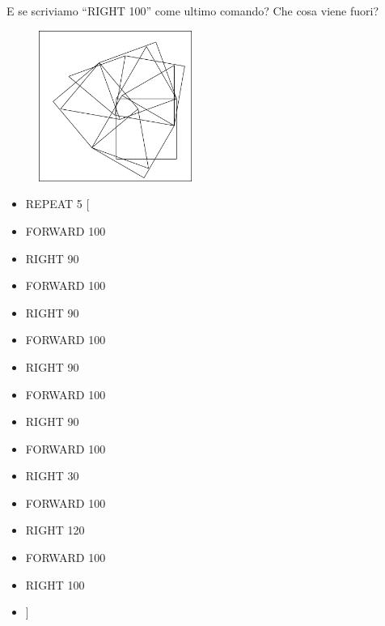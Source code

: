 E se scriviamo “RIGHT 100” come ultimo comando? Che cosa viene fuori? 

\begin{minipage}{0.5\textwidth}
\begin{figure}[H]
   \includegraphics[width=5.0cm,trim=4 4 6 4,clip]{./images/marta/mar-5.png}
   \label{mar-5}
\end{figure}
\end{minipage} \hfill
\begin{minipage}{0.45\textwidth}
\begin{itemize}[itemsep=-3pt,parsep=2pt]
\item[] \hspace{0.5cm} REPEAT 5 [
\item[] \hspace{0.5cm} 	FORWARD 100
\item[] \hspace{0.5cm} 	RIGHT 90
\item[] \hspace{0.5cm} 	FORWARD 100
\item[] \hspace{0.5cm} 	RIGHT 90
\item[] \hspace{0.5cm} 	FORWARD 100
\item[] \hspace{0.5cm} 	RIGHT 90
\item[] \hspace{0.5cm} 	FORWARD 100
\item[] \hspace{0.5cm} 	RIGHT 90
\item[] \hspace{0.5cm} 	FORWARD 100
\item[] \hspace{0.5cm} 	RIGHT 30
\item[] \hspace{0.5cm} 	FORWARD 100
\item[] \hspace{0.5cm} 	RIGHT 120
\item[] \hspace{0.5cm} 	FORWARD 100
\item[] \hspace{0.5cm} 	RIGHT 100
\item[] \hspace{0.5cm} 	]          
\end{itemize}
\end{minipage}

